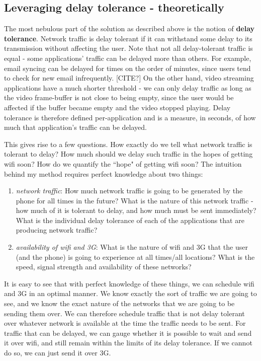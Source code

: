 \documentclass[12pt, fleqn]{article}
\begin{document}
\subsection{Leveraging delay tolerance - theoretically}

The most nebulous part of the solution as described above is the notion of 
\textbf{delay tolerance}. Network traffic is delay tolerant if it can withstand some 
delay to its transmission without affecting the user. Note that not all 
delay-tolerant traffic is equal - some applications' traffic can be delayed more than others. 
For example, email syncing can be delayed for times on the order of minutes, since users 
tend to check for new email infrequently. [CITE?] On the other hand, 
video streaming applications have a much shorter threshold - we can only delay 
traffic as long as the video frame-buffer is not close to being empty, since 
the user would be affected if the buffer became empty and the video stopped 
playing. Delay tolerance is therefore defined per-application and is a 
measure, in seconds, of how much that application's traffic can be delayed. 

This gives rise to a few questions. How exactly do we tell what network traffic is tolerant to 
delay? How much should we delay such traffic in the hopes of getting wifi soon?
How do we quantify the ``hope" of getting wifi soon? The intuition behind my method 
requires perfect knowledge about two things:
\begin{enumerate}
  \item \emph{network traffic}: How much network traffic is going to be 
  generated by the phone for all times in the future? What is the nature of this 
  network traffic - how much of it is tolerant to delay, and how much must be 
  sent immediately? What is the individual delay tolerance of each of the 
  applications that are producing network traffic?
  \item \emph{availability of wifi and 3G}: What is the nature of wifi and 3G 
  that the user (and the phone) is going to experience at all times/all 
  locations? What is the speed, signal strength and availability of these 
  networks?
\end{enumerate}
It is easy to see that with perfect knowledge of these things, we can schedule 
wifi and 3G in an optimal manner. We know exactly the sort of traffic we are
going to see, and we know the exact nature of the networks that we are going to 
be sending them over. We can therefore schedule traffic that is not delay 
tolerant over whatever network is available at the time the traffic needs to be 
sent. For traffic that can be delayed, we can gauge whether it is possible to 
wait and send it over wifi, and still remain within the limits of its delay 
tolerance. If we cannot do so, we can just send it over 3G. 
\end{document}

